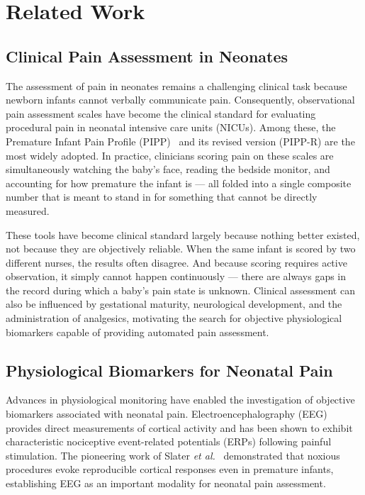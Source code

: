 \documentclass[conference]{IEEEtran}
\begin{document}
\section{Related Work}

\subsection{Clinical Pain Assessment in Neonates}

The assessment of pain in neonates remains a challenging clinical task because newborn infants cannot verbally communicate pain. Consequently, observational pain assessment scales have become the clinical standard for evaluating procedural pain in neonatal intensive care units (NICUs). Among these, the Premature Infant Pain Profile (PIPP)~\cite{stevens1996pipp} and its revised version (PIPP-R) are the most widely adopted. In practice, clinicians scoring pain on these scales are simultaneously watching the baby's face, reading the bedside monitor, and accounting for how premature the infant is — all folded into a single composite number that is meant to stand in for something that cannot be directly measured.

These tools have become clinical standard largely because nothing better existed, not because they are objectively reliable. When the same infant is scored by two different nurses, the results often disagree. And because scoring requires active observation, it simply cannot happen continuously — there are always gaps in the record during which a baby's pain state is unknown. Clinical assessment can also be influenced by gestational maturity, neurological development, and the administration of analgesics, motivating the search for objective physiological biomarkers capable of providing automated pain assessment.

\subsection{Physiological Biomarkers for Neonatal Pain}

Advances in physiological monitoring have enabled the investigation of objective biomarkers associated with neonatal pain. Electroencephalography (EEG) provides direct measurements of cortical activity and has been shown to exhibit characteristic nociceptive event-related potentials (ERPs) following painful stimulation. The pioneering work of Slater \textit{et al.}~\cite{slater2008cortical} demonstrated that noxious procedures evoke reproducible cortical responses even in premature infants, establishing EEG as an important modality for neonatal pain assessment.
\end{document}

